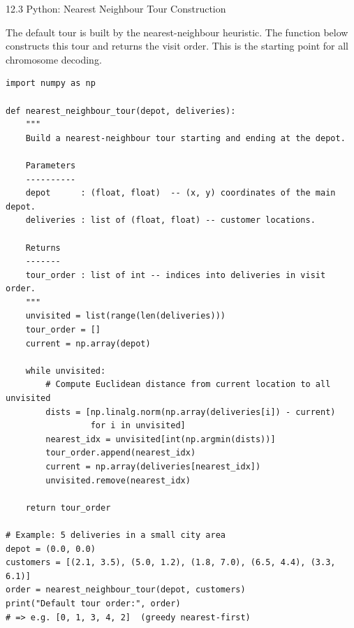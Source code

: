 \documentclass[aspectratio=169,10pt]{beamer}
\begin{document}
\begin{frame}[fragile]{12.3 Python: Nearest Neighbour Tour Construction}

The default tour is built by the nearest-neighbour heuristic.
The function below constructs this tour and returns the visit order.
This is the starting point for all chromosome decoding.

\begin{lstlisting}[caption={Nearest neighbour heuristic for default tour}]
import numpy as np

def nearest_neighbour_tour(depot, deliveries):
    """
    Build a nearest-neighbour tour starting and ending at the depot.

    Parameters
    ----------
    depot      : (float, float)  -- (x, y) coordinates of the main depot.
    deliveries : list of (float, float) -- customer locations.

    Returns
    -------
    tour_order : list of int -- indices into deliveries in visit order.
    """
    unvisited = list(range(len(deliveries)))
    tour_order = []
    current = np.array(depot)

    while unvisited:
        # Compute Euclidean distance from current location to all unvisited
        dists = [np.linalg.norm(np.array(deliveries[i]) - current)
                 for i in unvisited]
        nearest_idx = unvisited[int(np.argmin(dists))]
        tour_order.append(nearest_idx)
        current = np.array(deliveries[nearest_idx])
        unvisited.remove(nearest_idx)

    return tour_order

# Example: 5 deliveries in a small city area
depot = (0.0, 0.0)
customers = [(2.1, 3.5), (5.0, 1.2), (1.8, 7.0), (6.5, 4.4), (3.3, 6.1)]
order = nearest_neighbour_tour(depot, customers)
print("Default tour order:", order)
# => e.g. [0, 1, 3, 4, 2]  (greedy nearest-first)
\end{lstlisting}

\end{frame}
\end{document}
